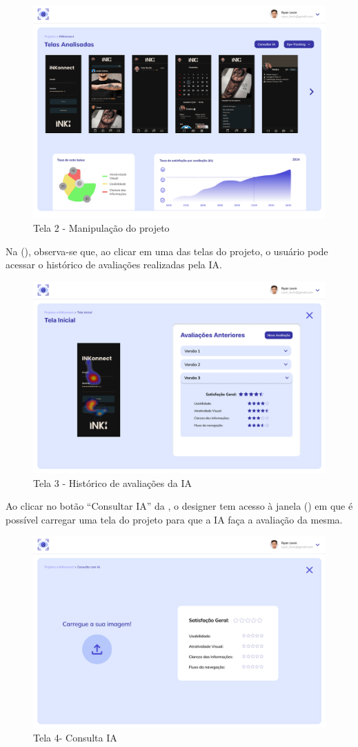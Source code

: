 \begin{figure}[H]
    \centering
    \caption{Tela 2 - Manipulação do projeto}%
    \label{fig:pg-tela2}
    \includegraphics[width=0.72\linewidth]{Illustrations/tela2.png}
\end{figure}

Na (), observa-se que, ao clicar em uma das telas do projeto, o usuário pode acessar o histórico de avaliações realizadas pela IA.

\begin{figure}[H]
    \centering
    \caption{Tela 3 - Histórico de avaliações da IA}%
    \label{fig:pg-tela3}
    \includegraphics[width=0.72\linewidth]{Illustrations/tela3.png}
\end{figure}

Ao clicar no botão “Consultar IA” da , o designer tem acesso à janela () em que é possível carregar uma tela do projeto para que a IA faça a avaliação da mesma.

\begin{figure}[H]
    \centering
    \caption{Tela 4- Consulta IA}%
    \label{fig:pg-tela4}
    \includegraphics[width=0.72\linewidth]{Illustrations/tela4.png}
\end{figure}

